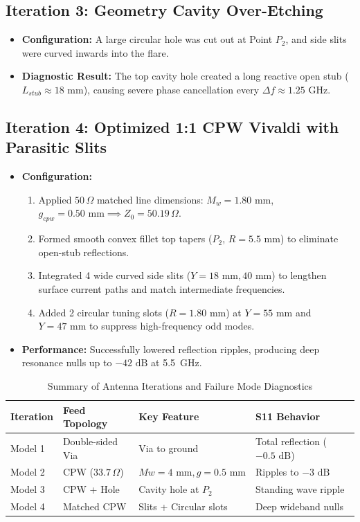 \documentclass[journal,compsoc,twocolumn,10pt]{IEEEtran}
\begin{document}
\subsection{Iteration 3: Geometry Cavity Over-Etching}
\begin{itemize}
    \item \textbf{Configuration:} A large circular hole was cut out at Point $P_2$, and side slits were curved inwards into the flare.
    \item \textbf{Diagnostic Result:} The top cavity hole created a long reactive open stub ($L_{stub} \approx 18\text{ mm}$), causing severe phase cancellation every $\Delta f \approx 1.25\text{ GHz}$.
\end{itemize}

\subsection{Iteration 4: Optimized 1:1 CPW Vivaldi with Parasitic Slits}
\begin{itemize}
    \item \textbf{Configuration:} 
    \begin{enumerate}
        \item Applied $50\,\Omega$ matched line dimensions: $M_w = 1.80\text{ mm}$, $g_{cpw} = 0.50\text{ mm} \implies Z_0 = 50.19\,\Omega$.
        \item Formed smooth convex fillet top tapers ($P_2$, $R = 5.5\text{ mm}$) to eliminate open-stub reflections.
        \item Integrated 4 wide curved side slits ($Y = 18\text{ mm}, 40\text{ mm}$) to lengthen surface current paths and match intermediate frequencies.
        \item Added 2 circular tuning slots ($R = 1.80\text{ mm}$) at $Y = 55\text{ mm}$ and $Y = 47\text{ mm}$ to suppress high-frequency odd modes.
    \end{enumerate}
    \item \textbf{Performance:} Successfully lowered reflection ripples, producing deep resonance nulls up to $-42\text{ dB}$ at 5.5~GHz.
\end{itemize}

\begin{table}[htbp]
\caption{Summary of Antenna Iterations and Failure Mode Diagnostics}
\label{tab:iterations}
\centering
\begin{tabular}{@{}llll@{}}
\toprule
\textbf{Iteration} & \textbf{Feed Topology} & \textbf{Key Feature} & \textbf{S11 Behavior} \\ \midrule
Model 1 & Double-sided Via & Via to ground & Total reflection ($-0.5\text{ dB}$) \\
Model 2 & CPW ($33.7\,\Omega$) & $Mw=4\text{ mm}, g=0.5\text{ mm}$ & Ripples to $-3\text{ dB}$ \\
Model 3 & CPW + Hole & Cavity hole at $P_2$ & Standing wave ripple \\
Model 4 & Matched CPW & Slits + Circular slots & Deep wideband nulls \\ \bottomrule
\end{tabular}
\end{table}
\end{document}
